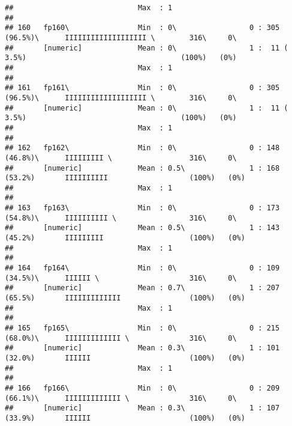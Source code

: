 \documentclass[]{article}
\begin{document}
\begin{verbatim}
##                             Max  : 1                                                                                       
## 
## 160   fp160\                Min  : 0\                 0 : 305 (96.5%)\      IIIIIIIIIIIIIIIIIII \        316\     0\       
##       [numeric]             Mean : 0\                 1 :  11 ( 3.5%)                                    (100%)   (0%)     
##                             Max  : 1                                                                                       
## 
## 161   fp161\                Min  : 0\                 0 : 305 (96.5%)\      IIIIIIIIIIIIIIIIIII \        316\     0\       
##       [numeric]             Mean : 0\                 1 :  11 ( 3.5%)                                    (100%)   (0%)     
##                             Max  : 1                                                                                       
## 
## 162   fp162\                Min  : 0\                 0 : 148 (46.8%)\      IIIIIIIII \                  316\     0\       
##       [numeric]             Mean : 0.5\               1 : 168 (53.2%)       IIIIIIIIII                   (100%)   (0%)     
##                             Max  : 1                                                                                       
## 
## 163   fp163\                Min  : 0\                 0 : 173 (54.8%)\      IIIIIIIIII \                 316\     0\       
##       [numeric]             Mean : 0.5\               1 : 143 (45.2%)       IIIIIIIII                    (100%)   (0%)     
##                             Max  : 1                                                                                       
## 
## 164   fp164\                Min  : 0\                 0 : 109 (34.5%)\      IIIIII \                     316\     0\       
##       [numeric]             Mean : 0.7\               1 : 207 (65.5%)       IIIIIIIIIIIII                (100%)   (0%)     
##                             Max  : 1                                                                                       
## 
## 165   fp165\                Min  : 0\                 0 : 215 (68.0%)\      IIIIIIIIIIIII \              316\     0\       
##       [numeric]             Mean : 0.3\               1 : 101 (32.0%)       IIIIII                       (100%)   (0%)     
##                             Max  : 1                                                                                       
## 
## 166   fp166\                Min  : 0\                 0 : 209 (66.1%)\      IIIIIIIIIIIII \              316\     0\       
##       [numeric]             Mean : 0.3\               1 : 107 (33.9%)       IIIIII                       (100%)   (0%)     

\end{verbatim}
\end{document}
